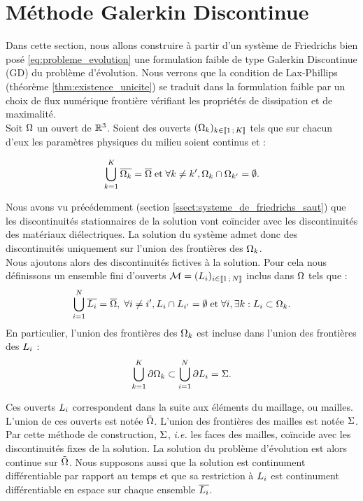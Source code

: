 \section{Méthode Galerkin Discontinue}
\label{sect:formulation_gd}

Dans cette section, nous allons construire à partir d’un système de Friedrichs
bien posé \eqref{eq:probleme_evolution} une formulation faible de type Galerkin
Discontinue (GD) du problème d’évolution. Nous verrons que la condition de Lax-Phillips
(théorème \ref{thm:existence_unicite}) se traduit dans la formulation faible par
un choix de flux numérique frontière vérifiant les propriétés de
dissipation et de maximalité.
\\

Soit $\Omega$ un ouvert de $\mathbb{R}^{3}$. Soient des ouverts
$(\Omega_k)_{k \in \lbrack\!\lbrack1\,;\,K\rbrack\!\rbrack}$ tels que sur chacun d’eux les paramètres
physiques du milieu soient continus et :

\begin{align}
	\bigcup_{k=1}^K \overline{\Omega_k} = \overline{\Omega} \; \mathrm{et} \;
	\forall k \ne k', \Omega_k \cap \Omega_{k'} = \emptyset .
\end{align}

Nous avons vu précédemment (section \ref{ssect:systeme_de_friedrichs_saut}) que les discontinuités stationnaires de
la solution vont coïncider avec les discontinuités des matériaux diélectriques.
La solution du système admet donc des discontinuités uniquement sur
l’union des frontières des $\Omega_k$.
\\

Nous ajoutons alors des discontinuités fictives à la solution. Pour cela
nous définissons un ensemble fini d’ouverts $\mathcal{M} = (L_i)_{i \in \lbrack\!\lbrack1\,;\,N\rbrack\!\rbrack}$
inclus dans $\Omega$ tels que :
\begin{align}
	\bigcup_{i=1}^N \overline{L_i} = \overline{\Omega} , \;
	\forall i \ne i', L_i \cap L_{i'} = \emptyset \; \mathrm{et} \;
	\forall i, \exists k : L_i \subset \Omega_k .
\end{align}
En particulier, l’union des frontières des $\Omega_k$ est incluse dans l’union des
frontières des $L_i$ :
\begin{align}
	\bigcup_{k=1}^K \partial\Omega_k
	\subset \bigcup_{i=1}^N \partial L_i
	= \Sigma .
\end{align}

Ces ouverts $L_i$ correspondent dans la suite aux éléments du maillage, ou mailles.
L'union de ces ouverts est notée $\tilde{\Omega}$. L'union des frontières des mailles
est notée $\Sigma$. Par cette méthode de construction, $\Sigma$,
\textit{i.e.} les faces des mailles, coïncide
avec les discontinuités fixes de la solution.
La solution du problème d’évolution est alors continue sur $\tilde{\Omega}$.
Nous supposons aussi que la solution est continument différentiable par
rapport au temps et que sa restriction à $L_i$ est continument
différentiable en espace sur chaque ensemble $\overline{L_i}$.
\\


